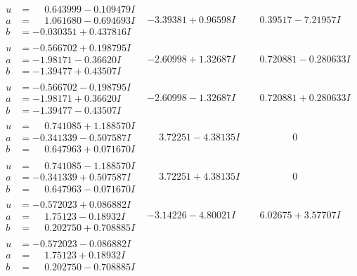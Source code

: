 \documentclass[1p]{elsarticle_modified}
\theoremstyle{definition}
\begin{document}
$$\begin{array}{c|c|c}
\begin{aligned}
u &= \phantom{-}0.643999 - 0.109479 I \\
a &= \phantom{-}1.061680 - 0.694693 I \\
b &= -0.030351 + 0.437816 I\end{aligned}
 & -3.39381 + 0.96598 I & \phantom{-}0.39517 - 7.21957 I \\ \hline\begin{aligned}
u &= -0.566702 + 0.198795 I \\
a &= -1.98171 - 0.36620 I \\
b &= -1.39477 + 0.43507 I\end{aligned}
 & -2.60998 + 1.32687 I & \phantom{-}0.720881 - 0.280633 I \\ \hline\begin{aligned}
u &= -0.566702 - 0.198795 I \\
a &= -1.98171 + 0.36620 I \\
b &= -1.39477 - 0.43507 I\end{aligned}
 & -2.60998 - 1.32687 I & \phantom{-}0.720881 + 0.280633 I \\ \hline\begin{aligned}
u &= \phantom{-}0.741085 + 1.188570 I \\
a &= -0.341339 - 0.507587 I \\
b &= \phantom{-}0.647963 + 0.071670 I\end{aligned}
 & \phantom{-}3.72251 - 4.38135 I & \phantom{-0.000000 } 0 \\ \hline\begin{aligned}
u &= \phantom{-}0.741085 - 1.188570 I \\
a &= -0.341339 + 0.507587 I \\
b &= \phantom{-}0.647963 - 0.071670 I\end{aligned}
 & \phantom{-}3.72251 + 4.38135 I & \phantom{-0.000000 } 0 \\ \hline\begin{aligned}
u &= -0.572023 + 0.086882 I \\
a &= \phantom{-}1.75123 - 0.18932 I \\
b &= \phantom{-}0.202750 + 0.708885 I\end{aligned}
 & -3.14226 - 4.80021 I & \phantom{-}6.02675 + 3.57707 I \\ \hline\begin{aligned}
u &= -0.572023 - 0.086882 I \\
a &= \phantom{-}1.75123 + 0.18932 I \\
b &= \phantom{-}0.202750 - 0.708885 I\end{aligned}

\end{array}$$
\end{document}
